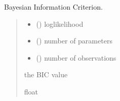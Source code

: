\documentclass[letterpaper,10pt,english]{sphinxmanual}
\begin{document}
\begin{fulllineitems}
\label{\detokenize{cubmods:cubmods.general.bic}}
\pysigstartsignatures
{}
\pysigstopsignatures
\sphinxAtStartPar
Bayesian Information Criterion.
\begin{quote}\begin{description}
\begin{itemize}
\item {} 
\sphinxAtStartPar
{} () \textendash{} log\sphinxhyphen{}likelihood

\item {} 
\sphinxAtStartPar
{} () \textendash{} number of parameters

\item {} 
\sphinxAtStartPar
{} () \textendash{} number of observations

\end{itemize}

\sphinxAtStartPar
the BIC value

\sphinxAtStartPar
float

\end{description}\end{quote}

\end{fulllineitems}

\end{document}
